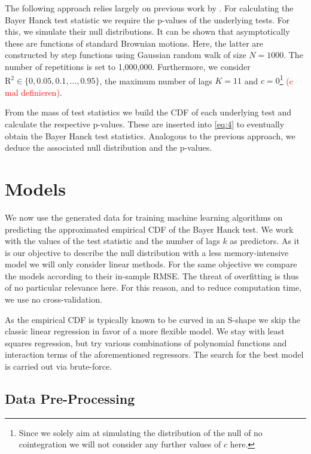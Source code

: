 \documentclass[12pt,a4paper]{article}
\let\rmarkdownfootnote\footnote%
\def\footnote{\protect\rmarkdownfootnote}
\begin{document}
The following approach relies largely on previous work by
\textcite{Pesavento_2004}. For calculating the Bayer Hanck test
statistic we require the p-values of the underlying tests. For this, we
simulate their null distributions. It can be shown that asymptotically
these are functions of standard Brownian motions. Here, the latter are
constructed by step functions using Gaussian random walk of size
\(N = 1000\). The number of repetitions is set to 1,000,000.
Furthermore, we consider \(\text{R}^2 \in \{0, 0.05, 0.1, ..., 0.95\}\),
the maximum number of lags \(K = 11\) and \(c = 0\)\footnote{Since we
  solely aim at simulating the distribution of the null of no
  cointegration we will not consider any further values of \(c\) here.}
\textcolor{red}{(c mal definieren)}.

From the mass of test statistics we build the \ac{CDF} of each
underlying test and calculate the respective p-values. These are
inserted into \eqref{eq:4} to eventually obtain the Bayer Hanck test
statistics. Analogous to the previous approach, we deduce the associated
null distribution and the p-values.

\hypertarget{models}{%
\section{Models}\label{models}}

We now use the generated data for training machine learning algorithms
on predicting the approximated empirical \ac{CDF} of the Bayer Hanck
test. We work with the values of the test statistic and the number of
lags \(k\) as predictors. As it is our objective to describe the null
distribution with a less memory-intensive model we will only consider
linear methods. For the same objective we compare the models according
to their in-sample \ac{RMSE}. The threat of overfitting is thus of no
particular relevance here. For this reason, and to reduce computation
time, we use no cross-validation.

As the empirical \ac{CDF} is typically known to be curved in an S-shape
we skip the classic linear regression in favor of a more flexible model.
We stay with least squares regression, but try various combinations of
polynomial functions and interaction terms of the aforementioned
regressors. The search for the best model is carried out via
brute-force.

\hypertarget{data-pre-processing}{%
\subsection{Data Pre-Processing}\label{data-pre-processing}}
\end{document}
